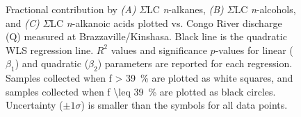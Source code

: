 \begin{figure}[p]
	\caption[Correlation between compound-class contribution and discharge]{Fractional contribution by \textit{(A)} $\Sigma$LC \textit{n}-alkanes, \textit{(B)} $\Sigma$LC \textit{n}-alcohols, and \textit{(C)} $\Sigma$LC \textit{n}-alkanoic acids plotted vs. Congo River discharge (Q) measured at Brazzaville/Kinshasa. Black line is the quadratic WLS regression line. $R^2$ values and significance $p$-values for linear ($\beta_1$) and quadratic ($\beta_2$) parameters are reported for each regression. Samples collected when f \SI{> 39}{\%} are plotted as white squares, and samples collected when f \SI{\leq 39}{\%} are plotted as black circles. Uncertainty ($\pm 1 \sigma$) is smaller than the symbols for all data points.}
	\label{Ch4Fig:10} 
\end{figure}

